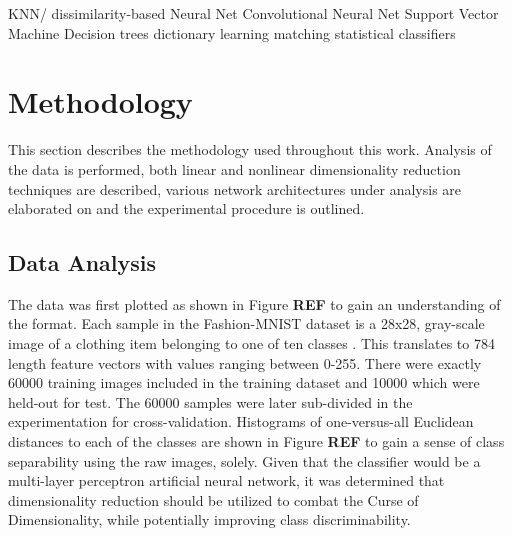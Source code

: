 \documentclass[conference]{IEEEtran}
\begin{document}
KNN/ dissimilarity-based
Neural Net
Convolutional Neural Net
Support Vector Machine
Decision trees
dictionary learning
matching
statistical classifiers


\section{Methodology} \label{Methodology}
	This section describes the methodology used throughout this work.  Analysis of the data is performed, both linear and nonlinear dimensionality reduction techniques are described, various network architectures under analysis are elaborated on and the experimental procedure is outlined.

	\subsection{Data Analysis}
	The data was first plotted as shown in Figure \textbf{REF} to gain an understanding of the format.  Each sample in the Fashion-MNIST dataset is a 28x28, gray-scale image of a clothing item belonging to one of ten classes \cite{Xiao2017FashionMNIST}. This translates to 784 length feature vectors with values ranging between 0-255. There were exactly 60000 training images included in the  training dataset and 10000 which were held-out for test.  The 60000 samples were later sub-divided in the experimentation for cross-validation. Histograms of one-versus-all Euclidean distances to each of the classes are shown in Figure \textbf{REF} to gain a sense of class separability using the raw images, solely.  Given that the classifier would be a multi-layer perceptron artificial neural network, it was determined that dimensionality reduction should be utilized to combat the Curse of Dimensionality, while potentially improving class discriminability.
	
\end{document}
